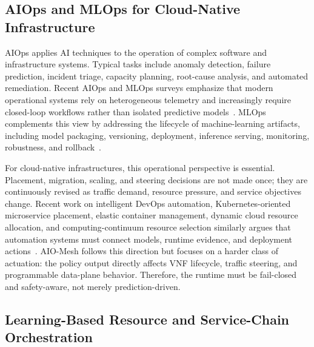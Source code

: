 \documentclass[final,5p]{elsarticle}
\begin{document}
\subsection{AIOps and MLOps for Cloud-Native Infrastructure}
\label{subsec:related_aiops}

AIOps applies AI techniques to the operation of complex software and infrastructure systems. Typical tasks include anomaly detection, failure prediction, incident triage, capacity planning, root-cause analysis, and automated remediation. Recent AIOps and MLOps surveys emphasize that modern operational systems rely on heterogeneous telemetry and increasingly require closed-loop workflows rather than isolated predictive models~\cite{diazdearcaya2024joint,zhang2025aiopsllm}. MLOps complements this view by addressing the lifecycle of machine-learning artifacts, including model packaging, versioning, deployment, inference serving, monitoring, robustness, and rollback~\cite{kreuzberger2023mlops,eken2025mlops,bayram2025trustworthy}.

For cloud-native infrastructures, this operational perspective is essential. Placement, migration, scaling, and steering decisions are not made once; they are continuously revised as traffic demand, resource pressure, and service objectives change. Recent work on intelligent DevOps automation, Kubernetes-oriented microservice placement, elastic container management, dynamic cloud resource allocation, and computing-continuum resource selection similarly argues that automation systems must connect models, runtime evidence, and deployment actions~\cite{eramo2024architecture,ding2023kubernetes,mao2023flowcon,chen2023workloadwindows,hortelano2023drlresource,chen2024crossedge,sedghani2024space4aid}. AIO-Mesh follows this direction but focuses on a harder class of actuation: the policy output directly affects VNF lifecycle, traffic steering, and programmable data-plane behavior. Therefore, the runtime must be fail-closed and safety-aware, not merely prediction-driven.



\subsection{Learning-Based Resource and Service-Chain Orchestration}
\label{subsec:related_learning}
\end{document}
